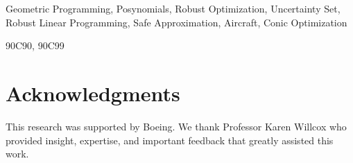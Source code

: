 \documentclass[review]{siamart1116}
\begin{document}
\maketitle



\begin{keywords}
  Geometric Programming, Posynomials, Robust Optimization, Uncertainty Set, Robust Linear Programming, Safe Approximation, Aircraft, Conic Optimization
\end{keywords}

\begin{AMS}
  90C90, 90C99
\end{AMS}












\section*{Acknowledgments}
This research was supported by Boeing. We thank Professor Karen Willcox who provided insight, expertise, and important feedback that greatly assisted this work.


\end{document}
